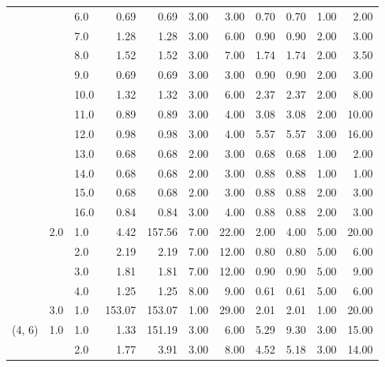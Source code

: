 \begin{tabular}{lllrrrrrrrr}
       &     & 6.0  &       0.69 &      0.69 &  3.00 &   3.00 &       0.70 &      0.70 &  1.00 &   2.00 \\
       &     & 7.0  &       1.28 &      1.28 &  3.00 &   6.00 &       0.90 &      0.90 &  2.00 &   3.00 \\
       &     & 8.0  &       1.52 &      1.52 &  3.00 &   7.00 &       1.74 &      1.74 &  2.00 &   3.50 \\
       &     & 9.0  &       0.69 &      0.69 &  3.00 &   3.00 &       0.90 &      0.90 &  2.00 &   3.00 \\
       &     & 10.0 &       1.32 &      1.32 &  3.00 &   6.00 &       2.37 &      2.37 &  2.00 &   8.00 \\
       &     & 11.0 &       0.89 &      0.89 &  3.00 &   4.00 &       3.08 &      3.08 &  2.00 &  10.00 \\
       &     & 12.0 &       0.98 &      0.98 &  3.00 &   4.00 &       5.57 &      5.57 &  3.00 &  16.00 \\
       &     & 13.0 &       0.68 &      0.68 &  2.00 &   3.00 &       0.68 &      0.68 &  1.00 &   2.00 \\
       &     & 14.0 &       0.68 &      0.68 &  2.00 &   3.00 &       0.88 &      0.88 &  1.00 &   1.00 \\
       &     & 15.0 &       0.68 &      0.68 &  2.00 &   3.00 &       0.88 &      0.88 &  2.00 &   3.00 \\
       &     & 16.0 &       0.84 &      0.84 &  3.00 &   4.00 &       0.88 &      0.88 &  2.00 &   3.00 \\
       & 2.0 & 1.0  &       4.42 &    157.56 &  7.00 &  22.00 &       2.00 &      4.00 &  5.00 &  20.00 \\
       &     & 2.0  &       2.19 &      2.19 &  7.00 &  12.00 &       0.80 &      0.80 &  5.00 &   6.00 \\
       &     & 3.0  &       1.81 &      1.81 &  7.00 &  12.00 &       0.90 &      0.90 &  5.00 &   9.00 \\
       &     & 4.0  &       1.25 &      1.25 &  8.00 &   9.00 &       0.61 &      0.61 &  5.00 &   6.00 \\
       & 3.0 & 1.0  &     153.07 &    153.07 &  1.00 &  29.00 &       2.01 &      2.01 &  1.00 &  20.00 \\
(4, 6) & 1.0 & 1.0  &       1.33 &    151.19 &  3.00 &   6.00 &       5.29 &      9.30 &  3.00 &  15.00 \\
       &     & 2.0  &       1.77 &      3.91 &  3.00 &   8.00 &       4.52 &      5.18 &  3.00 &  14.00 \\

\end{tabular}

